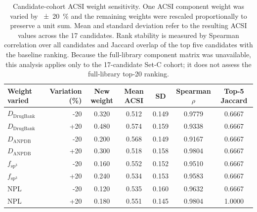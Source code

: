
\begin{table}[htbp]
\centering
\caption{Candidate-cohort ACSI weight sensitivity. One ACSI component weight was varied by \qty{\pm 20}{\percent} and the remaining weights were rescaled proportionally to preserve a unit sum. Mean and standard deviation refer to the resulting ACSI values across the \num{17} candidates. Rank stability is measured by Spearman correlation over all candidates and Jaccard overlap of the top five candidates with the baseline ranking. Because the full-library component matrix was unavailable, this analysis applies only to the 17-candidate Set-C cohort; it does not assess the full-library top-20 ranking.}
\label{tab:s4_acsi_sensitivity}
\scriptsize
\begin{tabular}{l r S[table-format=1.3] S[table-format=1.3] S[table-format=1.3] S[table-format=1.4] S[table-format=1.4]}
\toprule
Weight varied & Variation (\%) & {New weight} & {Mean ACSI} & {SD} & {Spearman $\rho$} & {Top-5 Jaccard} \\
\midrule
$D_{\mathrm{DrugBank}}$ & -20 & 0.320 & 0.512 & 0.149 & 0.9779 & 0.6667 \\
$D_{\mathrm{DrugBank}}$ & +20 & 0.480 & 0.574 & 0.159 & 0.9338 & 0.6667 \\
$D_{\mathrm{ANPDB}}$    & -20 & 0.200 & 0.568 & 0.149 & 0.9167 & 0.6667 \\
$D_{\mathrm{ANPDB}}$    & +20 & 0.300 & 0.518 & 0.158 & 0.9804 & 0.6667 \\
$f_{\mathrm{sp}^3}$      & -20 & 0.160 & 0.552 & 0.152 & 0.9510 & 0.6667 \\
$f_{\mathrm{sp}^3}$      & +20 & 0.240 & 0.534 & 0.153 & 0.9583 & 0.6667 \\
$\mathrm{NPL}$            & -20 & 0.120 & 0.535 & 0.160 & 0.9632 & 0.6667 \\
$\mathrm{NPL}$            & +20 & 0.180 & 0.551 & 0.145 & 0.9804 & 1.0000 \\
\bottomrule
\end{tabular}
\end{table}

